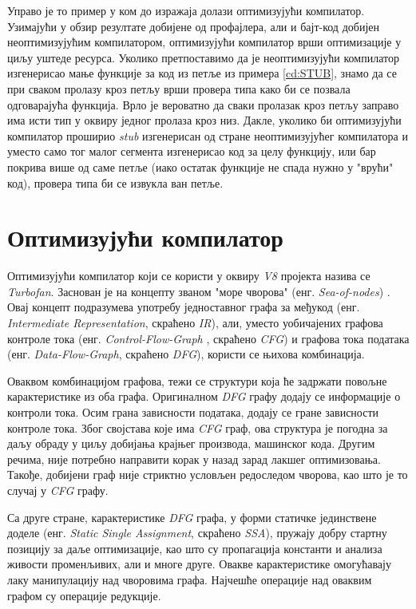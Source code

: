 \documentclass[12pt,oneside]{memoir}
\begin{document}
Управо је то пример у ком до изражаја долази оптимизујући компилатор. Узимајући у обзир резултате добијене од профајлера, али и бајт-код добијен неоптимизујућим компилатором,
оптимизујући компилатор врши оптимизације у циљу уштеде ресурса. Уколико претпоставимо да је неоптимизујући компилатор изгенерисао мање функције за код из петље из примера \ref{cd:STUB},
знамо да се при сваком пролазу кроз петљу врши провера типа како би се позвала одговарајућа функција. Врло је вероватно да сваки пролазак кроз петљу заправо
има исти тип у оквиру једног пролаза кроз низ. Дакле, уколико би оптимизујући компилатор проширио \textit{stub} изгенерисан од стране неоптимизујућег компилатора
и уместо само тог малог сегмента изгенерисао код за целу функцију, или бар покрива више од саме петље (иако остатак функције не спада нужно у "врући" код),
провера типа би се извукла ван петље.

\section{Оптимизујући компилатор} \label{chp:OPT}

Оптимизујући компилатор који се користи у оквиру \textit{V8} пројекта назива се \textit{Turbofan}. Заснован је на концепту званом "море чворова" (енг. \textit{Sea-of-nodes}) \cite{SON}.
Овај концепт подразумева употребу једноставног графа за међукод (енг. \textit{Intermediate Representation}, скраћено \textit{IR}), али, уместо уобичајених графова контроле тока (енг. \textit{Control-Flow-Graph}
, скраћено \textit{CFG}) и графова тока података (енг. \textit{Data-Flow-Graph}, скраћено \textit{DFG}), користи се њихова комбинација.

Оваквом комбинацијом графова, тежи се структури која ће задржати повољне карактеристике из оба графа. Оригиналном \textit{DFG} графу додају се информације о контроли тока.
Осим грана зависности података, додају се гране зависности контроле тока. Због својстава које има \textit{CFG} граф, ова структура је погодна за даљу обраду у
циљу добијања крајњег производа, машинског кода. Другим речима, није потребно направити корак у назад зарад лакшег оптимизовања. Такође, добијени граф није стриктно условљен
редоследом чворова, као што је то случај у \textit{CFG} графу.

Са друге стране, карактеристике \textit{DFG} графа, у форми статичке јединствене доделе (енг. \textit{Static Single Assignment}, скраћено \textit{SSA}), пружају добру стартну позицију
за даље оптимизације, као што су пропагација константи и анализа живости променљивих, али и многе друге. Овакве карактеристике омогућавају лаку манипулацију над чворовима графа.
Најчешће операције над оваквим графом су операције редукције.
\end{document}
